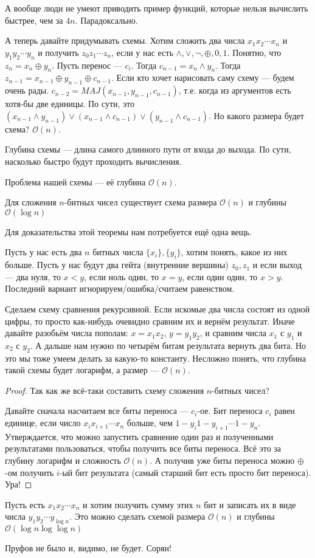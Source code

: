 А вообще люди не умеют приводить пример функций, которые нельзя вычислить быстрее, чем за $4n$. Парадоксально. 

А теперь давайте придумывать схемы. Хотим сложить два числа $x_1 x_2 \cdots x_n$ и $y_1 y_2 \cdots y_n$ и получить $z_0 z_1 \cdots z_n$, если у нас есть $\land, \lor, \lnot, \oplus, 0, 1$. Понятно, что $z_n = x_n \oplus y_n$.  Пусть перенос --- $c_i$. Тогда $c_{n-1} = x_n \land y_n$. Тогда $z_{n-1} = x_{n-1} \oplus y_{n-1} \oplus c_{n-1}$. Если кто хочет нарисовать саму схему --- будем очень рады. $c_{n-2} = MAJ(x_{n-1}, y_{n-1}, c_{n-1})$, т.е. когда из аргументов есть хотя-бы две единицы. По сути, это $(x_{n-1} \land y_{n-1}) \lor (x_{n-1} \land c_{n-1}) \lor (y_{n-1} \land c_{n-1})$. Но какого размера будет схема? $\mathcal{O}(n)$.

\begin{definition}
	Глубина схемы --- длина самого длинного пути от входа до выхода. По сути, насколько быстро будут проходить вычисления. 
\end{definition}

Проблема нашей схемы --- её глубина $\mathcal{O}(n)$. 

\begin{theorem}
	Для сложения $n$-битных чисел существует схема размера $\mathcal{O}(n)$ и глубины $\mathcal{O}(\log n)$
\end{theorem}

Для доказательства этой теоремы нам потребуется ещё одна вещь. 

Пусть у нас есть два $n$ битных числа $\{x_i\}, \{y_i\}$, хотим понять, какое из них больше. Пусть у нас будут два гейта (внутренние вершины) $z_0, z_1$ и если выход --- два нуля, то $x < y$, если ноль один, то $x = y$, если один один, то $x > y$. Последний вариант игнорируем/ошибка/считаем равенством. 

Сделаем схему сравнения рекурсивной. Если искомые два числа состоят из одной цифры, то просто как-нибудь очевидно сравним их и вернём результат. Иначе давайте разобьём числа пополам: $x = x_1 x_2$, $y = y_1 y_2$, и сравним числа $x_1$ с $y_1$ и $x_2$ с $y_2$. А дальше нам нужно по четырём битам результата вернуть два бита. Но это мы тоже умеем делать за какую-то константу. Несложно понять, что глубина такой схемы будет логарифм, а размер --- $\mathcal{O}(n)$. 

\begin{proof}
	Так как же всё-таки составить схему сложения $n$-битных чисел? 

	Давайте сначала насчитаем все биты переноса --- $c_i$-ое. Бит переноса $c_i$ равен единице, если число $x_i x_{i+1} \cdots x_n$ больше, чем $1-y_i 1-y_{i+1} \cdots 1-y_n$. Утверждается, что можно запустить сравнение один раз и полученными результатами пользоваться, чтобы получить все биты переноса. Всё это за глубину логарифм и сложность $\mathcal{O}(n)$. А получив уже биты переноса можно $\oplus$-ом получить $i$-ый бит результата (самый старший бит есть просто бит переноса). Ура!

\end{proof}

\begin{theorem}
	Пусть есть $x_1 x_2 \cdots x_n$ и хотим получить сумму этих $n$ бит и записать их в виде числа $y_1 y_2 \cdots y_{\log n}$. Это можно сделать схемой размера $\mathcal{O}(n)$ и глубины $\mathcal{O}(\log n \log \log n)$
\end{theorem}

Пруфов не было и, видимо, не будет. Сорян!
